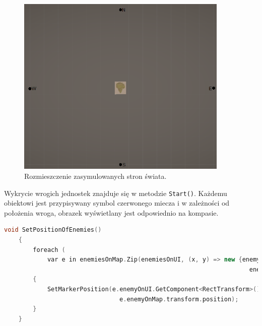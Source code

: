 \begin{figure}[htbp]
    \centering
    \includegraphics[width=0.9\textwidth]{images/ui/strony_swiata.png}
    \caption{Rozmieszczenie zasymulowanych stron świata.}\label{fig:world_sides}
\end{figure}
\FloatBarrier
Wykrycie wrogich jednostek znajduje się w metodzie \verb|Start()|. Każdemu obiektowi jest przypisywany symbol czerwonego miecza i w zależności od położenia wroga, obrazek wyświetlany jest odpowiednio na kompasie.
\begin{lstlisting}[language=C++, caption=Fragment kodu odpowiedzialny za połączenie wrogich obiektów na mapie z symbolami wyświetlonymi na kompasie.]
    void SetPositionOfEnemies()
    {
        foreach (
            var e in enemiesOnMap.Zip(enemiesOnUI, (x, y) => new {enemyOnMap = x, 
                                                                    enemyOnUI = y }))
        {
            SetMarkerPosition(e.enemyOnUI.GetComponent<RectTransform>(), 
                                e.enemyOnMap.transform.position);
        }
    }
\end{lstlisting}
